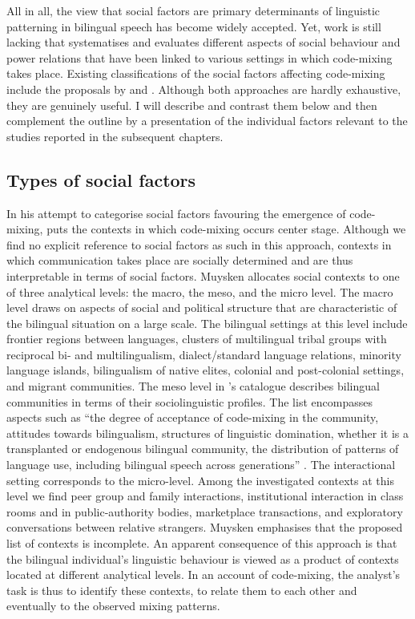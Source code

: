All in all, the view that social factors are primary determinants of linguistic patterning in bilingual speech has become widely accepted. Yet, work is still lacking that systematises and evaluates different aspects of social behaviour and power relations that have been linked to various settings in which code-mixing takes place. Existing classifications of the social factors affecting code-mixing include the proposals by \citet{muysken-bilingual-2000} and \citet{gardner-chloros_code-switching_2009}. Although both approaches are hardly exhaustive, they are genuinely useful. I will  describe and contrast them below and then complement the outline by a presentation of the individual factors relevant to the studies reported in the subsequent chapters.

\subsection{Types of social factors}
\begin{sloppypar}
In his attempt to categorise social factors favouring the emergence of code-mixing, \citet[][222--223]{muysken-bilingual-2000} puts the contexts in which code-mixing occurs center stage. Although we find no explicit reference to social factors as such in this approach, contexts in which communication takes place are socially determined and are thus interpretable in terms of social factors. Muysken allocates social contexts to one of three analytical levels: the macro, the meso, and the micro level. The macro level draws on aspects of social and political structure that are characteristic of the bilingual situation on a large scale. The bilingual settings at this level include frontier regions between languages, clusters of multilingual tribal groups with reciprocal bi- and multilingualism, dialect/standard language relations, minority language islands, bilingualism of native elites, colonial and post-colonial settings, and migrant communities. The meso level in \citeauthor{muysken-bilingual-2000}'s catalogue describes bilingual communities in terms of their sociolinguistic profiles. The list encompasses aspects such as ``the degree of acceptance of code-mixing in the community, attitudes towards bilingualism, structures of linguistic domination, whether it is a transplanted or endogenous bilingual community, the distribution of patterns of language use, including bilingual speech across generations'' \citep[][222]{muysken-bilingual-2000}. The interactional setting corresponds to the micro-level. Among the investigated contexts at this level we find peer group and family interactions, institutional interaction in class rooms and in public-authority bodies, marketplace transactions, and exploratory conversations between relative strangers. Muysken emphasises that the proposed list of contexts is incomplete. An apparent consequence of this approach is that the bilingual individual's linguistic behaviour is viewed as a product of contexts located at different analytical levels. In an account of code-mixing, the analyst's task is thus to identify these contexts, to relate them to each other and eventually to the observed mixing patterns.
\end{sloppypar}

